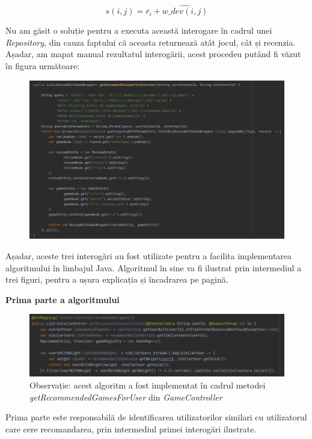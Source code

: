 \documentclass[12pt,a4paper]{report}
\begin{document}
\[  s(i,j) = \overline{r_i} + \hat{w\_dev(i,j)}  \]

Nu am găsit o soluție pentru a executa această interogare în cadrul unei \emph{Repository}, din cauza faptului că aceasta returnează atât jocul, cât și recenzia. Așadar, am mapat manual rezultatul interogării, acest procedeu putând fi văzut în figura următoare:

\begin{figure}[H]
\centering
\caption{}
\includegraphics[scale = 0.6]{exemplu_26_third_query}
\caption*{}
\end{figure}

Așadar, aceste trei interogări au fost utilizate pentru a facilita implementarea algoritmului în limbajul Java.
Algoritmul în sine va fi ilustrat prin intermediul a trei figuri, pentru a ușura explicația și încadrarea pe pagină.

\bigskip
\textbf{Prima parte a algoritmului}
\bigskip

\begin{figure}[H]
\centering
\caption{}
\includegraphics[scale = 0.7]{exemplu_27_first_part}
\caption*{Observație: acest algoritm a fost implementat în cadrul metodei \emph{getRecommendedGamesForUser} din \emph{GameController}}
\end{figure}

Prima parte este responsabilă de identificarea utilizatorilor similari cu utilizatorul care cere recomandarea, prin intermediul primei interogări ilustrate.
\end{document}
